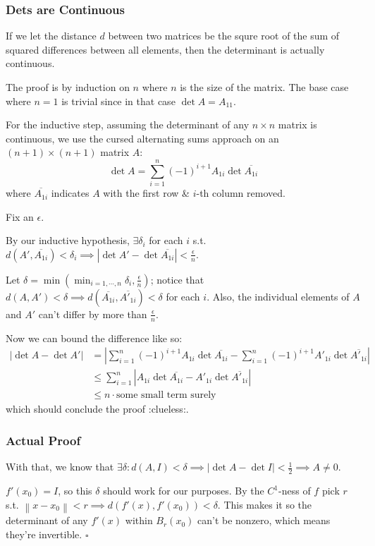\documentclass[12pt]{article}
\newcommand{\norm}[1]{\left\lVert#1\right\rVert}
\begin{document}
\subsubsection{Dets are Continuous}

If we let the distance $d$ between two matrices be the squre root of the sum
of squared differences between all elements, then the determinant is actually continuous.

The proof is by induction on $n$ where $n$ is the size of the matrix.
The base case where $n=1$ is trivial since in that case $\det A=A_{11}$.

For the inductive step, assuming the determinant of any $n \times n$ matrix is continuous,
we use the cursed alternating sums approach on an $(n+1) \times (n+1)$ matrix $A$:
\[\det A = \sum_{i=1}^{n} (-1)^{i+1} A_{1i} \det \overline{A_{1i}}\]
where $\overline{A_{1i}}$ indicates $A$ with the first row \& $i$-th column removed.

Fix an $\epsilon$.

By our inductive hypothesis, $\exists \delta_i$ for each $i$ s.t.
$d(A', \overline{A_{1i}}) < \delta_i \implies |\det A' - \det \overline{A_{1i}}| < \frac{\epsilon}{n}$.

Let $\delta=\min\left(\min_{i=1, \cdots, n} \delta_i, \frac{\epsilon}{n}\right)$;
notice that $d(A, A') < \delta \implies d(\overline{A_{1i}}, \overline{A'_{1i}}) < \delta$ for each $i$.
Also, the individual elements of $A$ and $A'$ can't differ by more than $\frac{\epsilon}{n}$.

Now we can bound the difference like so:
\begin{align*}
  |\det A - \det A'|
  &= \left|\sum_{i=1}^{n} (-1)^{i+1} A_{1i} \det \overline{A_{1i}} - \sum_{i=1}^{n} (-1)^{i+1} A'_{1i} \det \overline{A'_{1i}}\right| \\
  &\le \sum_{i=1}^{n} \left|A_{1i} \det \overline{A_{1i}} - A'_{1i} \det \overline{A'_{1i}}\right| \\
  &\le n \cdot \text{some small term surely}
\end{align*}
which should conclude the proof :clueless:.

\subsubsection{Actual Proof}

With that, we know that $\exists \delta: d(A, I) < \delta \implies |\det A - \det I| < \frac{1}{2} \implies A \ne 0$.

$f'(x_0)=I$, so this $\delta$ should work for our purposes.
By the $C^1$-ness of $f$ pick $r$ s.t. $\norm{x-x_0} < r \implies d(f'(x), f'(x_0)) < \delta$. 
This makes it so the determinant of any $f'(x)$ within $B_r(x_0)$ can't be nonzero,
which means they're invertible. $\square$
\end{document}
